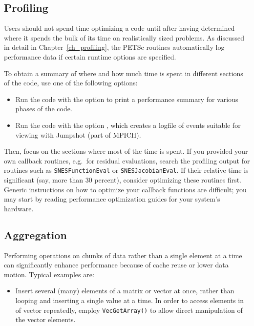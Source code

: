 {{{\subsection{Profiling}
  

Users should not spend time optimizing a code until after having determined
where it spends the bulk of its time on realistically sized problems.
As discussed in detail in Chapter~\ref{ch_profiling}, the PETSc
routines automatically log performance data if certain runtime options
are specified.

To obtain a summary of where and how much time is spent in different sections of the code, use one of the following options:
\begin{itemize}
\item Run the code with the option  to print a performance
   summary for various phases of the code. 
\item Run the code with the option  \trl{[logfilename]}, which creates a
   logfile of events suitable for viewing with Jumpshot (part of
   MPICH). 
\end{itemize}
Then, focus on the sections where most of the time is spent.
If you provided your own callback routines, e.g.~for residual evaluations, search the profiling output for routines such as \lstinline|SNESFunctionEval| or \lstinline|SNESJacobianEval|.
If their relative time is significant (say, more than 30 percent), consider optimizing these routines first.
Generic instructions on how to optimize your callback functions are difficult; you may start by reading performance optimization guides for your system's hardware.



\subsection{Aggregation}

Performing operations on chunks of data rather than a single element
at a time can significantly enhance performance because of cache reuse or lower data motion.
Typical examples are:
\begin{itemize}
\item Insert several (many) elements of a matrix or vector at once, rather
   than looping and inserting a single value at a time.  In order to
   access elements in of vector repeatedly, employ {\lstinline{VecGetArray()}} to allow
   direct manipulation of the vector elements.


\end{itemize}}}}
